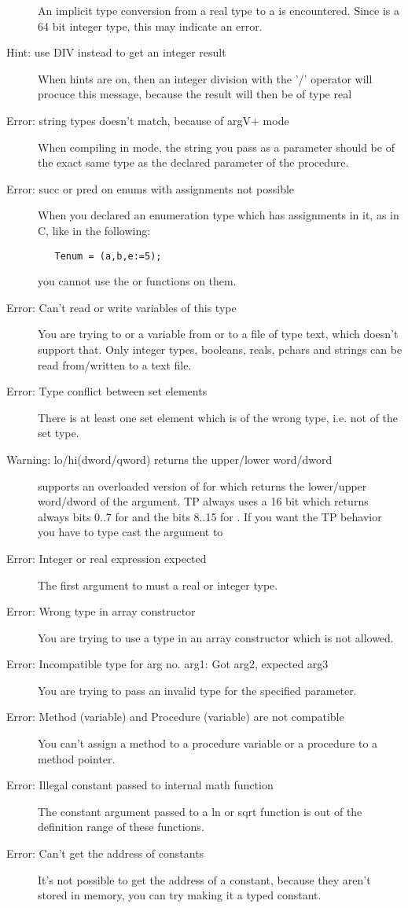 \begin{description}
 An implicit type conversion from a real type to a  is
 encountered. Since  is a 64 bit integer type, this may indicate
 an error.
\item [Hint: use DIV instead to get an integer result]
 When hints are on, then an integer division with the '/' operator will
 procuce this message, because the result will then be of type real
\item [Error: string types doesn't match, because of argV+ mode]
 When compiling in  mode, the string you pass as a parameter
 should be of the exact same type as the declared parameter of the procedure.
\item [Error: succ or pred on enums with assignments not possible]
 When you declared an enumeration type which has assignments in it, as in C,
 like in the following:
 \begin{verbatim}
   Tenum = (a,b,e:=5);
 \end{verbatim}
 you cannot use the  or  functions on them.
\item [Error: Can't read or write variables of this type]
 You are trying to  or  a variable from or to a
 file of type text, which doesn't support that. Only integer types,
 booleans, reals, pchars and strings can be read from/written to a text file.
\item [Error: Type conflict between set elements]
 There is at least one set element which is of the wrong type, i.e. not of
 the set type.
\item [Warning: lo/hi(dword/qword) returns the upper/lower word/dword]
 \fpc supports an overloaded version of  for 
 which returns the lower/upper word/dword of the argument. TP always uses
 a 16 bit  which returns always bits 0..7 for  and the
 bits 8..15 for . If you want the TP behavior you have
 to type cast the argument to 
\item [Error: Integer or real expression expected]
 The first argument to  must a real or integer type.
\item [Error: Wrong type in array constructor]
 You are trying to use a type in an array constructor which is not
 allowed.
\item [Error: Incompatible type for arg no. arg1: Got arg2, expected arg3]
 You are trying to pass an invalid type for the specified parameter.
\item [Error: Method (variable) and Procedure (variable) are not compatible]
 You can't assign a method to a procedure variable or a procedure to a
 method pointer.
\item [Error: Illegal constant passed to internal math function]
 The constant argument passed to a ln or sqrt function is out of
 the definition range of these functions.
\item [Error: Can't get the address of constants]
 It's not possible to get the address of a constant, because they
 aren't stored in memory, you can try making it a typed constant.
 \end{description}
